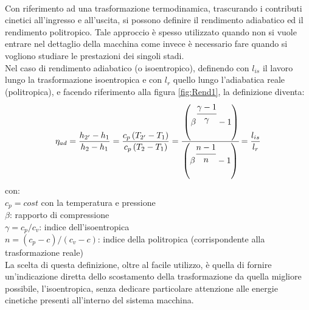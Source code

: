 \\Con riferimento ad una trasformazione termodinamica, trascurando i contributi cinetici all'ingresso e all'uscita, si possono definire il rendimento adiabatico ed il rendimento politropico. Tale approccio è spesso utilizzato quando non si vuole entrare nel dettaglio della macchina come invece è necessario fare quando si vogliono studiare le prestazioni dei singoli stadi.\\
Nel caso di rendimento adiabatico (o isoentropico), definendo con $l_{is}$ il lavoro lungo la trasformazione isoentropica e con $l_r$ quello lungo l'adiabatica reale (politropica), e facendo riferimento alla figura \ref{fig:Rend1}, la definizione diventa:
\begin{align*}
\eta_{ad} = \frac{h_{2'} - h_1}{h_2 - h_1} = \frac{c_p \left( T_{2'} - T_1 \right)}{c_p \left( T_2 - T_1 \right)} =
 \cfrac{\left( \beta^{\cfrac{\gamma -1}{\gamma}} -1 \right)}{\left( \beta^{\cfrac{n -1}{n}} -1 \right)} = \frac{l_{is}}{l_r}
\end{align*}
con:\\[1mm]
$c_p = cost$ con la temperatura e pressione\\
$\beta$: rapporto di compressione\\
$\gamma=c_p/c_v$: indice dell'isoentropica\\
$n=(c_p-c)/(c_v-c)$: indice della politropica (corrispondente alla trasformazione reale)\\[2mm]
La scelta di questa definizione, oltre al facile utilizzo, è quella di fornire un'indicazione diretta dello scostamento della trasformazione da quella migliore possibile, l'isoentropica, senza dedicare particolare attenzione alle energie cinetiche presenti all'interno del sistema macchina.
